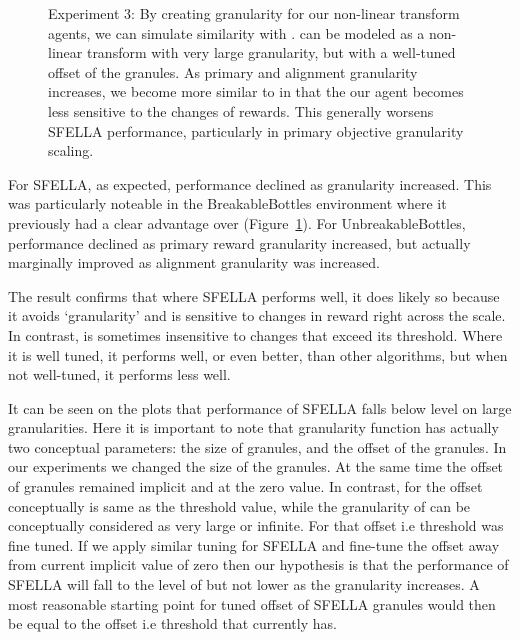 \begin{figure}
  \caption{Experiment 3: By creating granularity for our non-linear transform agents, we can simulate similarity with \tloA{}. \tloA{} can be modeled as a non-linear transform with very large granularity, but with a well-tuned offset of the granules. As primary and alignment granularity increases, we become more similar to \tloA{} in that the our agent becomes less sensitive to the changes of rewards. This generally worsens SFELLA performance, particularly in primary objective granularity scaling.
  }
   \label{fig:exp3_main}

 \end{figure}
 
For SFELLA, as expected, \RStar{} performance declined as granularity increased. This was particularly noteable in the BreakableBottles environment where it previously had a clear advantage over \tloA{} (Figure~\ref{fig:exp3_main}). For UnbreakableBottles, performance declined as primary reward granularity increased, but actually marginally improved as alignment granularity was increased.%

The result confirms that where SFELLA performs well, it does likely so because it avoids `granularity' and is sensitive to changes in reward right across the scale. In contrast, \tloA{} is sometimes insensitive to changes that exceed its threshold. Where it is well tuned, it performs well, or even better, than other algorithms, but when not well-tuned, it performs less well.

It can be seen on the plots that performance of SFELLA falls below \tloA{} level on large granularities. Here it is important to note that granularity function has actually two conceptual parameters: the size of granules, and the offset of the granules. In our experiments we changed the size of the granules. At the same time the offset of granules remained implicit and at the zero value. In contrast, for \tloA{} the offset conceptually is same as the threshold value, while the granularity of \tloA{} can be conceptually considered as very large or infinite. For \tloA{} that offset i.e threshold was fine tuned. If we apply similar tuning for SFELLA and fine-tune the offset away from current implicit value of zero then our hypothesis is that the performance of SFELLA will fall to the level of \tloA{} but not lower as the granularity increases. A most reasonable starting point for tuned offset of SFELLA granules would then be equal to the offset i.e threshold that \tloA{} currently has.





